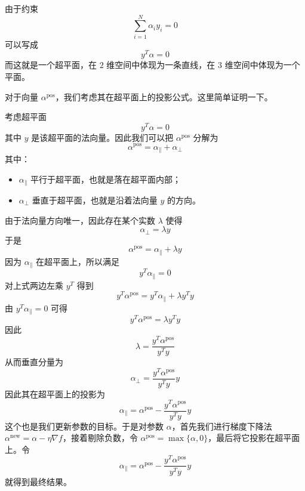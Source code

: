 由于约束
\begin{equation}
\sum_{i=1}^{N}\alpha_i y_i = 0
\end{equation}
可以写成
\begin{equation}
y^T\alpha = 0
\end{equation}
而这就是一个超平面，在 $2$ 维空间中体现为一条直线，在 $3$ 维空间中体现为一个平面。

对于向量 $\alpha^{\text{pos}}$，我们考虑其在超平面上的投影公式。这里简单证明一下。

考虑超平面
\begin{equation}
y^T\alpha = 0
\end{equation}
其中 $y$ 是该超平面的法向量。因此我们可以把 $\alpha^{\text{pos}}$ 分解为
\begin{equation}
\alpha^{\text{pos}} = \alpha_{\parallel} + \alpha_{\perp}
\end{equation}
其中：
\begin{itemize}
    \item $\alpha_{\parallel}$ 平行于超平面，也就是落在超平面内部；
    \item $\alpha_{\perp}$ 垂直于超平面，也就是沿着法向量 $y$ 的方向。
\end{itemize}

由于法向量方向唯一，因此存在某个实数 $\lambda$ 使得
\begin{equation}
\alpha_{\perp} = \lambda y
\end{equation}
于是
\begin{equation}
\alpha^{\text{pos}} = \alpha_{\parallel} + \lambda y
\end{equation}
因为 $\alpha_{\parallel}$ 在超平面上，所以满足
\begin{equation}
y^T\alpha_{\parallel} = 0
\end{equation}
对上式两边左乘 $y^T$ 得到
\begin{equation}
y^T\alpha^{\text{pos}} = y^T\alpha_{\parallel} + \lambda y^Ty
\end{equation}
由 $y^T\alpha_{\parallel} = 0$ 可得
\begin{equation}
y^T\alpha^{\text{pos}} = \lambda y^Ty
\end{equation}
因此
\begin{equation}
\lambda = \frac{y^T\alpha^{\text{pos}}}{y^Ty}
\end{equation}
从而垂直分量为
\begin{equation}
\alpha_{\perp} = \frac{y^T\alpha^{\text{pos}}}{y^Ty}y
\end{equation}
因此其在超平面上的投影为
\begin{equation}
\boxed{\alpha_{\parallel} = \alpha^{\text{pos}} - \frac{y^T\alpha^{\text{pos}}}{y^Ty}y}
\end{equation}
这个也是我们更新参数的目标。于是对参数 $\alpha$，首先我们进行梯度下降法 $\alpha^{\text{new}} = \alpha - \eta \nabla f$，接着剔除负数，令 $\alpha^{\text{pos}} = \max\{\alpha, 0\}$，最后将它投影在超平面上。令
\begin{equation}
\alpha_{\parallel} = \alpha^{\text{pos}} - \dfrac{y^T\alpha^{\text{pos}}}{y^Ty}y
\end{equation}
就得到最终结果。